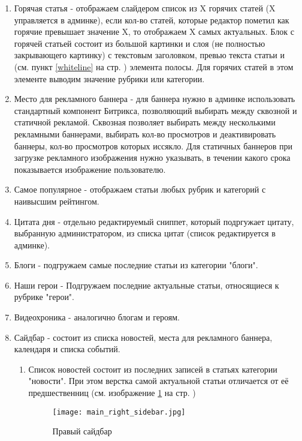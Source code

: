 \documentclass[DIV=calc, paper=a4, fontsize=11pt]{scrartcl} %
\begin{document}
\begin{enumerate}
    \item Горячая статья - отображаем слайдером список из X горячих статей (X управляется в админке), если кол-во статей, которые редактор пометил как горячие превышает значение X, то отображаем X самых актуальных. Блок с горячей статьей состоит из большой картинки и слоя (не полностью закрывающего картинку) с текстовым заголовком, превью текста статьи и (см. пункт \ref{whiteline} на стр. \pageref{whiteline} ) элемента полосы. Для горячих статей в этом элементе выводим значение рубрики или категории.
    \item Место для рекламного баннера - для баннера нужно в админке использовать стандартный компонент Битрикса, позволяющий выбирать между сквозной и статичной рекламой. Сквозная позволяет выбирать между несколькими рекламными баннерами, выбирать кол-во просмотров и деактивировать баннеры, кол-во просмотров которых иссякло. Для статичных баннеров при загрузке рекламного изображения нужно указывать, в течении какого срока показывается изображение пользователю.
    \item \label{subsec:mostpopular}Самое популярное - отображаем статьи любых рубрик и категорий с наивысшим рейтингом.
    \item Цитата дня - отдельно редактируемый сниппет, который подргужает цитату, выбранную администратором, из списка цитат (список редактируется в админке).
    \item Блоги - подгружаем самые последние статьи из категории "блоги".
    \item Наши герои - Подгружаем последние актуальные статьи, относящиеся к рубрике "герои".
    \item Видеохроника - аналогично блогам и героям.
    \item Сайдбар - состоит из списка новостей, места для рекламного баннера, календаря и списка событий.
        \begin{enumerate}
            \item Список новостей состоит из последних записей в статьях категории "новости". При этом верстка самой актуальной статьи отличается от её предшественниц (см. изображение \ref{fig:main_right_sidebar.jpg} на стр. \pageref{fig:main_right_sidebar.jpg})
            \begin{figure}[ht!]
            \centering
            \texttt{[image: main\_right\_sidebar.jpg]}
            \caption{Правый сайдбар \label{fig:main_right_sidebar.jpg}}
            \end{figure}

\end{enumerate}
\end{enumerate}
\end{document}
